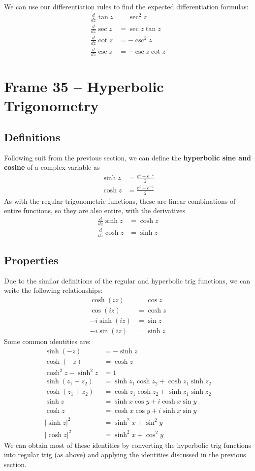 \documentclass{article}
\renewcommand{\emph}{\textbf}
\begin{document}
We can use our differentiation rules to find the expected differentiation formulas:
\begin{align*}
	\frac{d}{dz} \tan z &= \sec^2 z \\
	\frac{d}{dz} \sec z &= \sec z \tan z \\
	\frac{d}{dz} \cot z &= -\csc^2 z \\
	\frac{d}{dz} \csc z &= -\csc z \cot z
\end{align*}


\clearpage
\section{Frame 35 -- Hyperbolic Trigonometry}
\subsection{Definitions}
Following suit from the previous section, we can define the \emph{hyperbolic sine and cosine} of a complex variable as
\begin{align*}
	\sinh z &= \frac{e^z - e^{-z}}{2} \\
	\cosh z &= \frac{e^z + e^{-z}}{2}
\end{align*}
As with the regular trigonometric functions, these are linear combinations of entire functions, so they are also entire, with the derivatives
\begin{align*}
	\frac{d}{dz} \sinh z &= \cosh z \\
	\frac{d}{dz} \cosh z &= \sinh z
\end{align*}

\subsection{Properties}
Due to the similar definitions of the regular and hyperbolic trig functions, we can write the following relationships:
\begin{align*}
	\cosh(iz) &= \cos z \\
	\cos (iz) &= \cosh z \\
	-i \sinh(iz) &= \sin z \\
	-i \sin (iz) &= \sinh z
\end{align*}
Some common identities are:
\begin{align*}
	\sinh(-z) &= - \sinh z \\
	\cosh(-z) &=   \cosh z \\
	\cosh^2 z - \sinh^2 z &= 1 \\ 
	\sinh(z_1 + z_2) &= \sinh z_1 \cosh z_2 + \cosh z_1 \sinh z_2 \\
	\cosh(z_1 + z_2) &= \cosh z_1 \cosh z_2 + \sinh z_1 \sinh z_2 \\
	\sinh z &= \sinh x \cos y + i \cosh x \sin y \\
	\cosh z &= \cosh x \cos y + i \sinh x \sin y \\
	| \sinh z |^2 &= \sinh^2 x + \sin^2 y \\
	| \cosh z |^2 &= \sinh^2 x + \cos^2 y
\end{align*}
We can obtain most of these identities by converting the hyperbolic trig functions into regular trig (as above) and applying the identities discussed in the previous section.
\end{document}
